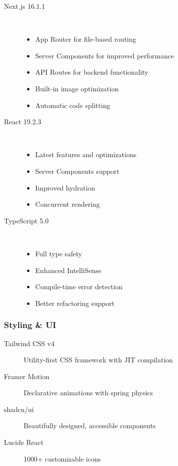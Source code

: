 \documentclass[12pt,a4paper]{article}
\begin{document}
\begin{description}
    \item[Next.js 16.1.1] ~
    \begin{itemize}
        \item App Router for file-based routing
        \item Server Components for improved performance
        \item API Routes for backend functionality
        \item Built-in image optimization
        \item Automatic code splitting
    \end{itemize}

    \item[React 19.2.3] ~
    \begin{itemize}
        \item Latest features and optimizations
        \item Server Components support
        \item Improved hydration
        \item Concurrent rendering
    \end{itemize}

    \item[TypeScript 5.0] ~
    \begin{itemize}
        \item Full type safety
        \item Enhanced IntelliSense
        \item Compile-time error detection
        \item Better refactoring support
    \end{itemize}
\end{description}

\subsubsection{Styling \& UI}

\begin{description}
    \item[Tailwind CSS v4] Utility-first CSS framework with JIT compilation
    \item[Framer Motion] Declarative animations with spring physics
    \item[shadcn/ui] Beautifully designed, accessible components
    \item[Lucide React] 1000+ customizable icons
\end{description}
\end{document}
